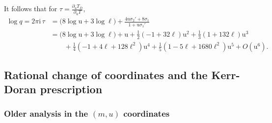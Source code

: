\documentclass[11pt, a4paper]{article}
\newcommand{\ii}{\mathrm{i}}
\newcommand{\ur}{\mathrm{u}}
\numberwithin{equation}{section}
\begin{document}
It follows that for $\tau = \frac{\partial_\ur T_D}{\partial_\ur T}$,
\begin{equation}
  \begin{aligned}
    \log q = 2 \pi \ii \, \tau &= \bigl(8 \log \ur + 3 \log \ell\bigr) + \frac{4 \ur \sigma_2' + 8 \sigma_1}{1+\ur \sigma_1'} \\
    &= \bigl(8\log \ur + 3\log \ell\bigr) + \ur + \frac{1}{2}(-1 + 32\ell)\ur^2 + \frac{1}{3}(1 + 132\ell)\ur^3 \\
    &\qquad + \frac{1}{4}(-1 + 4\ell + 128\ell^2)\ur^4 + \frac{1}{5}(1 - 5\ell + 1680\ell^2)\ur^5 + O(\ur^6).
  \end{aligned}
\end{equation}



\subsection{Rational change of coordinates and the Kerr-Doran prescription}

\subsubsection{Older analysis in the \texorpdfstring{$(m, u)$}{(m, u)} coordinates}
\end{document}
